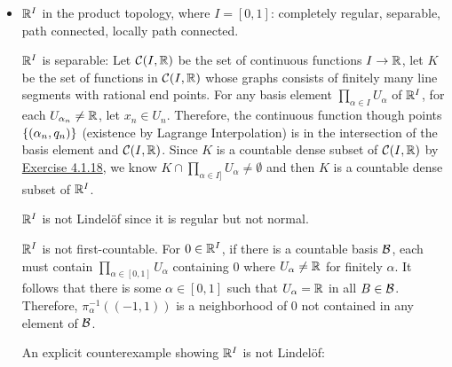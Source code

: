 \documentclass[12pt,a4paper]{article}
\begin{document}
\begin{ex}
\begin{itemize}
\begin{remark}
                $\R^\omega$ is not first-countable in the box topology. Suppose at $x$ there is a countable basis $\set{\prod_{n=1}^\infty U_{m,n}:m\in\Z^+}$. For $U_{m,m}$ there is a $V_m$ properly contained in $U_{m,m}$ containing $\pi_m(x)$ (since $\R$ is normal). It follows that $\prod_{m=1}^\infty V_m$ does not contain any element in the basis, a contradiction.

                $\R^\omega$ is not Lindel\"of in the box topology. Since $\R^\omega$ is not Lindel\"of in the uniform topology, there is an open cover $\mathcal{C}$ that does not have a countable subcover. Note that $\mathcal{C}$ is also an open cover in the box topology without a countable subcover, then it implies $\R^\omega$ is not Lindel\"of in the box topology.

                $\R^\omega$ is not separable in the box topology. Suppose $K\subset\R^\omega$ is countable dense in $\R^\omega$. Then $K$ is dense in $\R^\omega$ in the uniform topology, a contradiction.

                The normality of $\R^\omega$ in the box topology is undecidable.
            \end{remark}
            \item $\mathbb{R}^I$ in the product topology, where $I=[0,1]$: completely regular, separable, path connected, locally path connected.
            \begin{remark}
                $\mathbb{R}^I$ is separable: Let $\mathcal{C}(I,\mathbb{R})$ be the set of continuous functions $I\to\mathbb{R}$, let $K$ be the set of functions in $\mathcal{C}(I,\mathbb{R})$ whose graphs consists of finitely many line segments with rational end points. For any basis element $\prod_{\alpha\in I}U_\alpha$ of $\mathbb{R}^I$, for each $U_{\alpha_n}\neq\mathbb{R}$, let $x_n\in U_n$. Therefore, the continuous function though points $\left\{(\alpha_n,q_n)\right\}$ (existence by Lagrange Interpolation) is in the intersection of the basis element and $\mathcal{C}(I,\mathbb{R})$. Since $K$ is a countable dense subset of $\mathcal{C}(I,\mathbb{R})$ by \hyperref[4.1.18]{Exercise 4.1.18}, we know $K\cap\prod_{\alpha\in I]}U_\alpha\neq\emptyset$ and then $K$ is a countable dense subset of $\mathbb{R}^I$.

                $\mathbb{R}^I$ is not Lindel\"of since it is regular but not normal.

                $\mathbb{R}^I$ is not first-countable. For $0\in\mathbb{R}^I$, if there is a countable basis $\mathcal{B}$, each must contain $\prod_{\alpha\in[0,1]} U_\alpha$ containing $0$ where $U_\alpha\neq\mathbb{R}$ for finitely $\alpha$. It follows that there is some $\alpha\in[0,1]$ such that $U_\alpha=\mathbb{R}$ in all $B\in\mathcal{B}$. Therefore, $\pi_\alpha^{-1}((-1,1))$ is a neighborhood of $0$ not contained in any element of $\mathcal{B}$.
            \end{remark}
            \begin{remark}
                An explicit counterexample showing $\mathbb{R}^I$ is not Lindel\"of:
                

\end{remark}
\end{itemize}
\end{ex}
\end{document}
